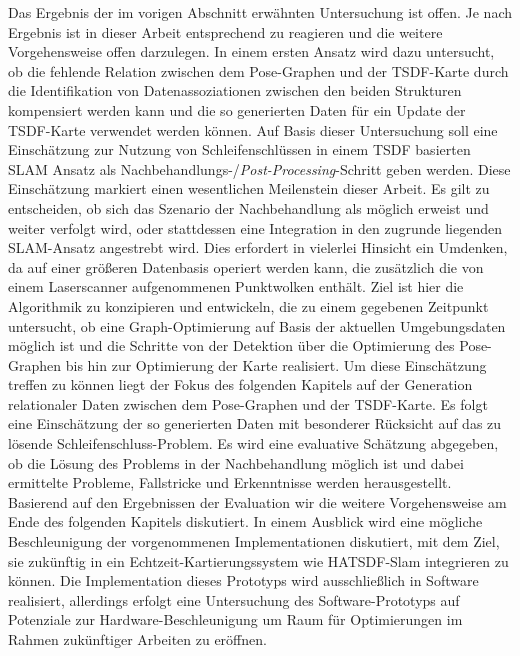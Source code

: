 Das Ergebnis der im vorigen Abschnitt erwähnten Untersuchung ist offen. Je nach Ergebnis ist in dieser Arbeit entsprechend zu reagieren und die weitere Vorgehensweise offen darzulegen. In einem ersten Ansatz wird dazu untersucht, ob die fehlende Relation zwischen dem Pose-Graphen und der TSDF-Karte durch die Identifikation von Datenassoziationen zwischen den beiden Strukturen kompensiert werden kann und die so generierten Daten für ein Update der TSDF-Karte verwendet werden können. Auf Basis dieser Untersuchung soll eine Einschätzung zur Nutzung von Schleifenschlüssen in einem TSDF basierten SLAM Ansatz als Nachbehandlungs-/\emph{Post-Processing}-Schritt geben werden. Diese Einschätzung markiert einen wesentlichen Meilenstein dieser Arbeit. Es gilt zu entscheiden, ob sich das Szenario der Nachbehandlung als möglich erweist und weiter verfolgt wird, oder  stattdessen eine Integration in den zugrunde liegenden SLAM-Ansatz angestrebt wird. Dies erfordert in vielerlei Hinsicht ein Umdenken, da auf einer größeren Datenbasis operiert werden kann, die zusätzlich die von einem Laserscanner aufgenommenen Punktwolken enthält. Ziel ist hier die Algorithmik zu konzipieren und entwickeln, die zu einem gegebenen Zeitpunkt untersucht, ob eine Graph-Optimierung auf Basis der aktuellen Umgebungsdaten möglich ist und die Schritte von der Detektion über die Optimierung des Pose-Graphen bis hin zur Optimierung der Karte realisiert. Um diese Einschätzung treffen zu können liegt der Fokus des folgenden Kapitels auf der Generation relationaler Daten zwischen dem Pose-Graphen und der TSDF-Karte. Es folgt eine Einschätzung der so generierten Daten mit besonderer Rücksicht auf das zu lösende Schleifenschluss-Problem. Es wird eine evaluative Schätzung abgegeben, ob die Lösung des Problems in der Nachbehandlung möglich ist und dabei ermittelte Probleme, Fallstricke und Erkenntnisse werden herausgestellt. Basierend auf den Ergebnissen der Evaluation wir die weitere Vorgehensweise am Ende des folgenden Kapitels diskutiert. In einem Ausblick wird eine mögliche Beschleunigung der vorgenommenen Implementationen diskutiert, mit dem Ziel, sie zukünftig in ein Echtzeit-Kartierungssystem wie HATSDF-Slam integrieren zu können. Die Implementation dieses Prototyps wird ausschließlich in Software realisiert, allerdings erfolgt eine Untersuchung des Software-Prototyps auf Potenziale zur Hardware-Beschleunigung um Raum für Optimierungen im Rahmen zukünftiger Arbeiten zu eröffnen.


